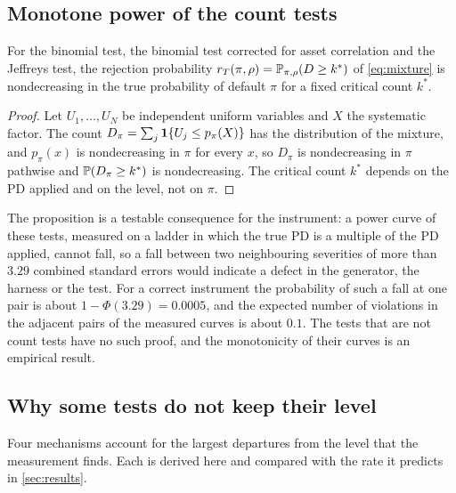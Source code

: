 \subsection{Monotone power of the count tests}
\label{sec:th-monotone}

\begin{proposition}
\label{prop:monotone}
For the binomial test, the binomial test corrected for asset correlation and the Jeffreys test, the rejection probability $r_T(\pi,\rho)=\mathbb{P}_{\pi,\rho}(D\ge k^*)$ of \eqref{eq:mixture} is nondecreasing in the true probability of default $\pi$ for a fixed critical count $k^*$.
\end{proposition}
\begin{proof}
Let $U_1,\dots,U_N$ be independent uniform variables and $X$ the systematic factor. The count $D_\pi=\sum_j\mathbf{1}\{U_j\le p_\pi(X)\}$ has the distribution of the mixture, and $p_\pi(x)$ is nondecreasing in $\pi$ for every $x$, so $D_\pi$ is nondecreasing in $\pi$ pathwise and $\mathbb{P}(D_\pi\ge k^*)$ is nondecreasing. The critical count $k^*$ depends on the PD applied and on the level, not on $\pi$.
\end{proof}

The proposition is a testable consequence for the instrument: a power curve of these tests, measured on a ladder in which the true PD is a multiple of the PD applied, cannot fall, so a fall between two neighbouring severities of more than $3.29$ combined standard errors would indicate a defect in the generator, the harness or the test.
For a correct instrument the probability of such a fall at one pair is about $1-\Phi(3.29)=0.0005$, and the expected number of violations in the \nMonoPairs{} adjacent pairs of the measured curves is about $0.1$.
The tests that are not count tests have no such proof, and the monotonicity of their curves is an empirical result.

\subsection{Why some tests do not keep their level}
\label{sec:th-failures}

Four mechanisms account for the largest departures from the level that the measurement finds.
Each is derived here and compared with the rate it predicts in \cref{sec:results}.

